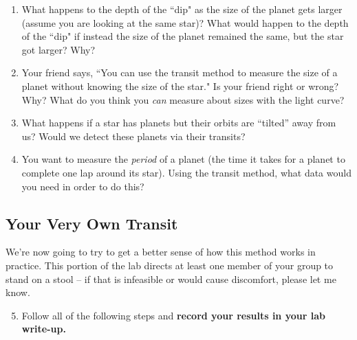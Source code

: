 \documentclass[11pt]{article}
\begin{document}
\begin{enumerate}
    \item What happens to the depth of the ``dip" as the size of the planet gets larger (assume you are looking at the same star)? What would happen to the depth of the ``dip" if instead the size of the planet remained the same, but the star got larger?  Why?
    
    \item Your friend says, ``You can use the transit method to measure the size of a planet without knowing the size of the star." Is your friend right or wrong? Why? What do you think you \textit{can} measure about sizes with the light curve?
    
    \item What happens if a star has planets but their orbits are “tilted” away from us? Would we detect these planets via their transits?
    
    \item You want to measure the \textit{period} of a planet (the time it takes for a planet to complete one lap around its star). Using the transit method, what data would you need in order to do this?
    
\end{enumerate}

\subsection{Your Very Own Transit}
\noindent
We’re now going to try to get a better sense of how this method works in practice. This portion of the lab directs at least one member of your group to stand on a stool -- if that is infeasible or would cause discomfort, please let me know.  

\begin{enumerate}
\setcounter{enumi}{4}
    \item Follow all of the following steps and \textbf{record your results in your lab write-up.}
\end{enumerate}
\end{document}
